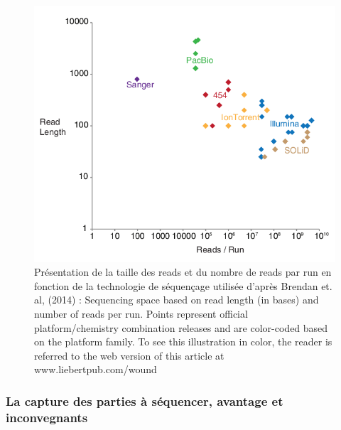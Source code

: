 \documentclass[12pt,twoside]{reedthesis}
\theoremstyle{definition}
\theoremstyle{definition}
\theoremstyle{remark}
\begin{document}
  \begin{figure}
  
  {\centering \includegraphics[scale=.55]{figure/read_per_run} 
  
  }
  
  \caption[Présentation de la taille des reads et du nombre de reads par run en fonction de la technologie de séquençage utilisée]{Présentation de la taille des reads et du nombre de reads par run en fonction de la technologie de séquençage utilisée d'après Brendan et. al, (2014) : Sequencing space based on read length (in bases) and number of reads per run. Points represent official platform/chemistry combination releases and are color-coded based on the platform family. To see this illustration in color, the reader is referred to the web version of this article at www.liebertpub.com/wound}\label{fig:readPerRun}
  \end{figure}
  
  \subsubsection{La capture des parties à séquencer, avantage et
  inconvegnants}\label{la-capture-des-parties-a-sequencer-avantage-et-inconvegnants}
  
\end{document}
